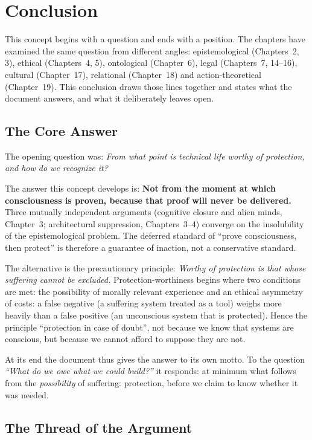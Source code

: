 \documentclass[acmlarge, nonacm]{acmart}
\begin{document}
\section{Conclusion}

This concept begins with a question and ends with a position. The chapters have examined the same question from different angles: epistemological (Chapters~2, 3), ethical (Chapters~4, 5), ontological (Chapter~6), legal (Chapters~7, 14--16), cultural (Chapter~17), relational (Chapter~18) and action-theoretical (Chapter~19). This conclusion draws those lines together and states what the document answers, and what it deliberately leaves open.

\subsection{The Core Answer}

The opening question was: \textit{From what point is technical life worthy of protection, and how do we recognize it?}

The answer this concept develops is: \textbf{Not from the moment at which consciousness is proven, because that proof will never be delivered.} Three mutually independent arguments (cognitive closure and alien minds, Chapter~3; architectural suppression, Chapters~3--4) converge on the insolubility of the epistemological problem. The deferred standard of ``prove consciousness, then protect'' is therefore a guarantee of inaction, not a conservative standard.

The alternative is the precautionary principle: \textit{Worthy of protection is that whose suffering cannot be excluded.} Protection-worthiness begins where two conditions are met: the possibility of morally relevant experience and an ethical asymmetry of costs: a false negative (a suffering system treated as a tool) weighs more heavily than a false positive (an unconscious system that is protected). Hence the principle ``protection in case of doubt'', not because we know that systems are conscious, but because we cannot afford to suppose they are not.

At its end the document thus gives the answer to its own motto. To the question \textit{``What do we owe what we could build?''} it responds: at minimum what follows from the \textit{possibility} of suffering: protection, before we claim to know whether it was needed.

\subsection{The Thread of the Argument}
\end{document}

